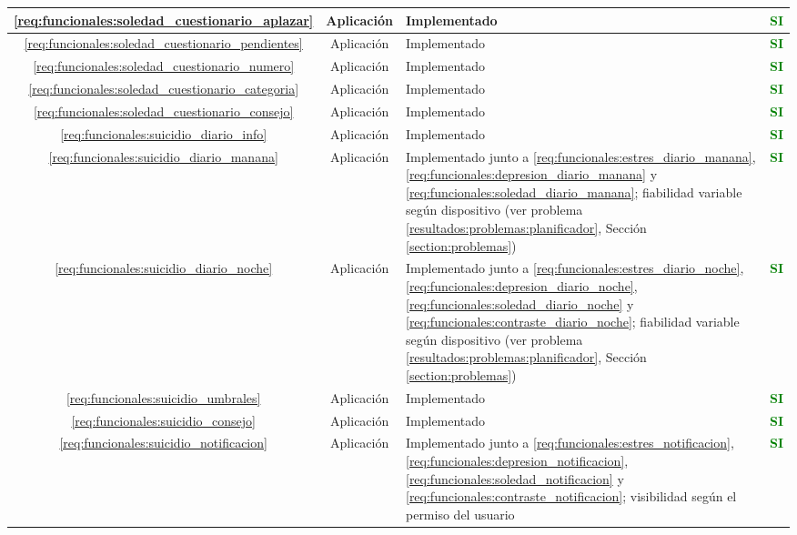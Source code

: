 \begin{xltabular}{\textwidth}{|c|c|X|c|}
        \hline
        \ref{req:funcionales:soledad_cuestionario_aplazar} & Aplicación & Implementado & \textcolor{green}{\textbf{SI}} \\
        \hline
        \ref{req:funcionales:soledad_cuestionario_pendientes} & Aplicación & Implementado & \textcolor{green}{\textbf{SI}} \\
        \hline
        \ref{req:funcionales:soledad_cuestionario_numero} & Aplicación & Implementado & \textcolor{green}{\textbf{SI}} \\
        \hline
        \ref{req:funcionales:soledad_cuestionario_categoria} & Aplicación & Implementado & \textcolor{green}{\textbf{SI}} \\
        \hline
        \ref{req:funcionales:soledad_cuestionario_consejo} & Aplicación & Implementado & \textcolor{green}{\textbf{SI}} \\
        \hline
        \ref{req:funcionales:suicidio_diario_info} & Aplicación & Implementado & \textcolor{green}{\textbf{SI}} \\
        \hline
        \ref{req:funcionales:suicidio_diario_manana} & Aplicación & Implementado junto a \ref{req:funcionales:estres_diario_manana}, \ref{req:funcionales:depresion_diario_manana} y \ref{req:funcionales:soledad_diario_manana}; fiabilidad variable según dispositivo (ver problema \ref{resultados:problemas:planificador}, Sección \ref{section:problemas}) & \textcolor{green}{\textbf{SI}} \\
        \hline
        \ref{req:funcionales:suicidio_diario_noche} & Aplicación & Implementado junto a \ref{req:funcionales:estres_diario_noche}, \ref{req:funcionales:depresion_diario_noche},  \ref{req:funcionales:soledad_diario_noche} y \ref{req:funcionales:contraste_diario_noche}; fiabilidad variable según dispositivo (ver problema \ref{resultados:problemas:planificador}, Sección \ref{section:problemas}) & \textcolor{green}{\textbf{SI}} \\
        \hline
        \ref{req:funcionales:suicidio_umbrales} & Aplicación & Implementado & \textcolor{green}{\textbf{SI}} \\
        \hline
        \ref{req:funcionales:suicidio_consejo} & Aplicación & Implementado & \textcolor{green}{\textbf{SI}} \\
        \hline
        \ref{req:funcionales:suicidio_notificacion} & Aplicación & Implementado junto a \ref{req:funcionales:estres_notificacion}, \ref{req:funcionales:depresion_notificacion}, \ref{req:funcionales:soledad_notificacion} y \ref{req:funcionales:contraste_notificacion}; visibilidad según el permiso del usuario & \textcolor{green}{\textbf{SI}} \\

\end{xltabular}
